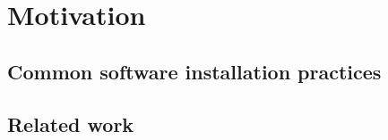 
\section{Motivation}
\label{sec:motivation}

\subsection{Common software installation practices}

\subsection{Related work}

\cite{hoste+:pyhpc12}
